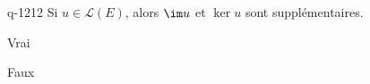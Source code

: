 \begin{truefalse}{q-1212}
Si $u\in \mathcal{L}(E)$, alors $\im u$ et $\ker u$ sont supplémentaires.
\item Vrai
\item* Faux
\end{truefalse}

